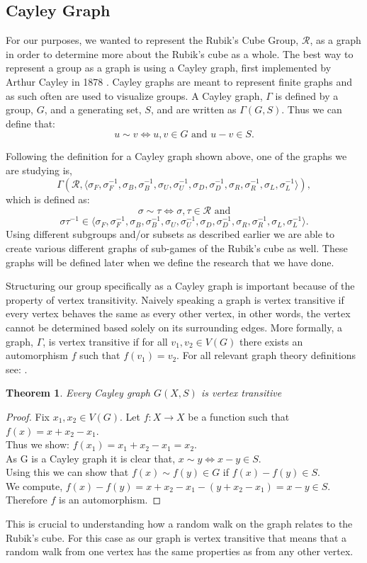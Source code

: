 \documentclass{article}
\newtheorem{theorem}{Theorem}[section]
\begin{document}
\subsection{Cayley Graph}
For our purposes, we wanted to represent the Rubik's Cube Group, $\mathcal{R}$, as a graph in order to determine more about the Rubik's cube as a whole.  The best way to represent a group as a graph is using a Cayley graph, first implemented by Arthur Cayley in 1878 \cite{godsil01}.  Cayley graphs are meant to represent finite graphs and as such often are used to visualize groups.  A Cayley graph, $\Gamma$ is defined by a group, $G$, and a generating set, $S$, and are written as $\Gamma(G, S)$.  Thus we can define that: $$u \sim v \iff u,v \in G \text{ and } u-v \in S.$$  

Following the definition for a Cayley graph shown above, one of the graphs we are studying is, $$\Gamma(\mathcal{R},\langle \sigma_F, \sigma_F^{-1}, \sigma_B,\sigma_B^{-1}, \sigma_U, \sigma_U^{-1}, \sigma_D, \sigma_D^{-1}, \sigma_R, \sigma_R^{-1}, \sigma_L, \sigma_L^{-1} \rangle),$$ which is defined as:
$$\sigma \sim \tau \iff \sigma,\tau \in \mathcal{R} \text{ and}$$ $$ \sigma\tau^{-1} \in \langle \sigma_F, \sigma_F^{-1}, \sigma_B,\sigma_B^{-1}, \sigma_U, \sigma_U^{-1}, \sigma_D, \sigma_D^{-1}, \sigma_R, \sigma_R^{-1}, \sigma_L, \sigma_L^{-1} \rangle.$$  Using different subgroups and/or subsets as described earlier we are able to create various different graphs of sub-games of the Rubik's cube as well.  These graphs will be defined later when we define the research that we have done.

Structuring our group specifically as a Cayley graph is important because of the property of vertex transitivity.  Naively speaking a graph is vertex transitive if every vertex behaves the same as every other vertex, in other words, the vertex cannot be determined based solely on its surrounding edges.  More formally, a graph, $\Gamma$, is vertex transitive if for all $v_1,v_2 \in V(G)$ there exists an automorphism $f$ such that $f(v_1) = v_2$. For all relevant graph theory definitions see: \cite{godsil01}.
\begin{theorem}
    Every Cayley graph $G(X,S)$ is vertex transitive
\end{theorem}
\begin{proof}
    Fix $x_1, x_2 \in V(G)$.  Let $f: X \to X$ be a function such that $f(x) = x + x_2 - x_1$. \\
    Thus we show: $f(x_1) = x_1 + x_2 - x_1 = x_2$.\\
    As G is a Cayley graph it is clear that, $x \sim y \iff x-y \in S$.\\
    Using this we can show that $f(x) \sim f(y) \in G $ if $f(x) - f(y) \in S$. \\
    
    We compute, $f(x) - f(y) = x + x_2 -x_1 - (y +x_2-x_1) = x - y \in S.$ \\
    Therefore $f$ is an automorphism.
\end{proof}
This is crucial to understanding how a random walk on the graph relates to the Rubik's cube.  For this case as our graph is vertex transitive that means that a random walk from one vertex has the same properties as from any other vertex.
\end{document}
